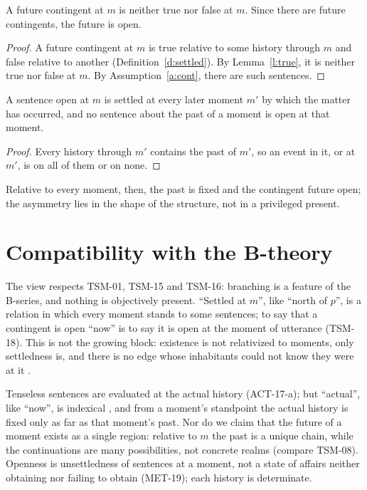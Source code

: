 \documentclass{situationist-preprint}
\begin{document}
\begin{theorem}\label{t:main}
A future contingent at $m$ is neither true nor false at $m$. Since there are future contingents, the future is open.
\end{theorem}

\begin{proof}
A future contingent at $m$ is true relative to some history through $m$ and false relative to another (Definition~\ref{d:settled}). By Lemma~\ref{l:true}, it is neither true nor false at $m$. By Assumption~\ref{a:cont}, there are such sentences.
\end{proof}

\begin{proposition}\label{p:settle}
A sentence open at $m$ is settled at every later moment $m'$ by which the matter has occurred, and no sentence about the past of a moment is open at that moment.
\end{proposition}

\begin{proof}
Every history through $m'$ contains the past of $m'$, so an event in it, or at $m'$, is on all of them or on none.
\end{proof}

Relative to every moment, then, the past is fixed and the contingent future open; the asymmetry lies in the shape of the structure, not in a privileged present.

\section{Compatibility with the B-theory}\label{s:btheory}

The view respects TSM-01, TSM-15 and TSM-16: branching is a feature of the B-series, and nothing is objectively present. \enquote{Settled at $m$}, like \enquote{north of $p$}, is a relation in which every moment stands to some sentences; to say that a contingent is open \enquote{now} is to say it is open at the moment of utterance (TSM-18). This is not the growing block: existence is not relativized to moments, only settledness is, and there is no edge whose inhabitants could not know they were at it \citep{Bourne2002,BraddonMitchell2004}.

Tenseless sentences are evaluated at the actual history (ACT-17-a); but \enquote{actual}, like \enquote{now}, is indexical \citep{Lewis1970}, and from a moment's standpoint the actual history is fixed only as far as that moment's past. Nor do we claim that the future of a moment exists as a single region: relative to $m$ the past is a unique chain, while the continuations are many possibilities, not concrete realms (compare TSM-08). Openness is unsettledness of sentences at a moment, not a state of affairs neither obtaining nor failing to obtain (MET-19); each history is determinate.
\end{document}
